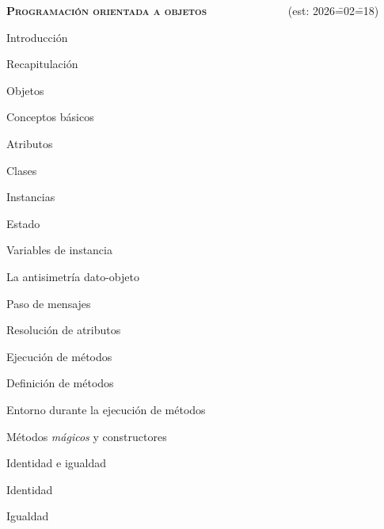 \begin{longenum}
\begin{longenum}
    \end{longenum}
    \item \textbf{\textsc{Programación orientada a objetos}} \ \ \ \ \ \ \ \ \ \ \ \ \ \ (est: 2026\==02\==18)
    \begin{longenum}
        \item Introducción
        \begin{longenum}
            \item Recapitulación
            \item Objetos
        \end{longenum}
        \item Conceptos básicos
        \begin{longenum}
            \item Atributos
            \item Clases
            \begin{longenum}
                \item Instancias
            \end{longenum}
            \item Estado
            \begin{longenum}
                \item Variables de instancia
            \end{longenum}
            \item La antisimetría dato-objeto
        \end{longenum}
        \item Paso de mensajes
        \begin{longenum}
            \item Resolución de atributos
            \item Ejecución de métodos
            \item Definición de métodos
            \begin{longenum}
                \item Entorno durante la ejecución de métodos
            \end{longenum}
            \item Métodos \textit{mágicos} y constructores
        \end{longenum}
        \item Identidad e igualdad
        \begin{longenum}
            \item Identidad
            \item Igualdad

\end{longenum}
\end{longenum}
\end{longenum}
